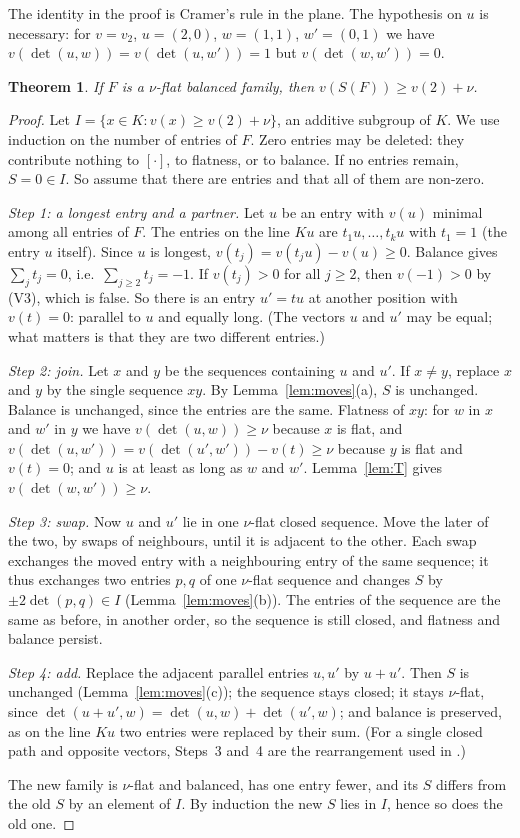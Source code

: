 \documentclass[11pt]{article}
\newtheorem{theorem}{Theorem}[section]
\theoremstyle{definition}
\newcommand{\ar}[1]{[#1]}
\begin{document}
The identity in the proof is Cramer's rule in the plane. The hypothesis on $u$ is necessary: for
$v=v_2$, $u=(2,0)$, $w=(1,1)$, $w'=(0,1)$ we have $v(\det(u,w))=v(\det(u,w'))=1$ but
$v(\det(w,w'))=0$.

\begin{theorem}\label{thm:M}
If $F$ is a $\nu$-flat balanced family, then $v(S(F))\ge v(2)+\nu$.
\end{theorem}

\begin{proof}
Let $I=\{x\in K:v(x)\ge v(2)+\nu\}$, an additive subgroup of $K$. We use induction on the number of
entries of $F$. Zero entries may be deleted: they contribute nothing to $\ar\cdot$, to flatness, or
to balance. If no entries remain, $S=0\in I$. So assume that there are entries and that all of them
are non-zero.

\emph{Step 1: a longest entry and a partner.} Let $u$ be an entry with $v(u)$ minimal among all
entries of $F$. The entries on the line $Ku$ are $t_1u,\dots,t_ku$ with $t_1=1$ (the entry $u$
itself). Since $u$ is longest, $v(t_j)=v(t_ju)-v(u)\ge0$. Balance gives $\sum_jt_j=0$, i.e.\
$\sum_{j\ge2}t_j=-1$. If $v(t_j)>0$ for all $j\ge2$, then $v(-1)>0$ by (V3), which is false. So
there is an entry $u'=tu$ at another position with $v(t)=0$: parallel to $u$ and equally long.
(The vectors $u$ and $u'$ may be equal; what matters is that they are two different entries.)

\emph{Step 2: join.} Let $x$ and $y$ be the sequences containing $u$ and $u'$. If $x\ne y$, replace
$x$ and $y$ by the single sequence $xy$. By Lemma~\ref{lem:moves}(a), $S$ is unchanged. Balance is
unchanged, since the entries are the same. Flatness of $xy$: for $w$ in $x$ and $w'$ in $y$ we have
$v(\det(u,w))\ge\nu$ because $x$ is flat, and $v(\det(u,w'))=v(\det(u',w'))-v(t)\ge\nu$ because $y$
is flat and $v(t)=0$; and $u$ is at least as long as $w$ and $w'$. Lemma~\ref{lem:T} gives
$v(\det(w,w'))\ge\nu$.

\emph{Step 3: swap.} Now $u$ and $u'$ lie in one $\nu$-flat closed sequence. Move the later of the
two, by swaps of neighbours, until it is adjacent to the other. Each swap exchanges the moved entry
with a neighbouring entry of the same sequence; it thus exchanges two entries $p,q$ of one
$\nu$-flat sequence and changes $S$ by $\pm2\det(p,q)\in I$ (Lemma~\ref{lem:moves}(b)). The entries
of the sequence are the same as before, in another order, so the sequence is still closed, and
flatness and balance persist.

\emph{Step 4: add.} Replace the adjacent parallel entries $u,u'$ by $u+u'$. Then $S$ is unchanged
(Lemma~\ref{lem:moves}(c)); the sequence stays closed; it stays $\nu$-flat, since
$\det(u+u',w)=\det(u,w)+\det(u',w)$; and balance is preserved, as on the line $Ku$ two entries were
replaced by their sum. (For a single closed path and opposite vectors, Steps~3 and~4 are the
rearrangement used in \cite[proof of Lemma 5]{Rud12}.)

The new family is $\nu$-flat and balanced, has one entry fewer, and its $S$ differs from the old $S$
by an element of $I$. By induction the new $S$ lies in $I$, hence so does the old one.
\end{proof}
\end{document}
